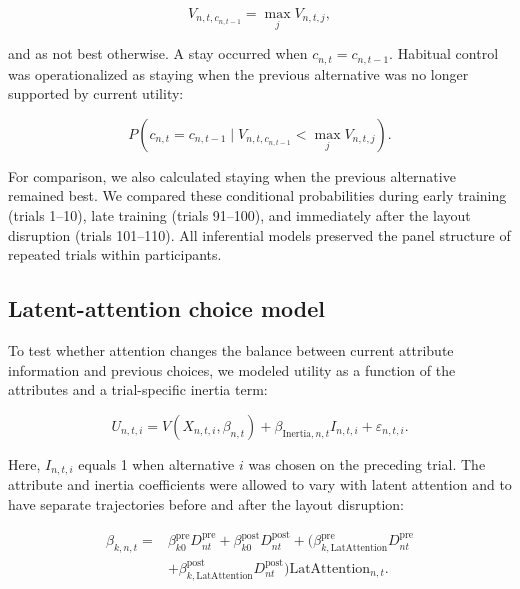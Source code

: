 \documentclass[man,natbib,floatsintext]{apa7}
\begin{document}
\begin{equation}
V_{n,t,c_{n,t-1}}=\max_j V_{n,t,j},
\end{equation}

and as not best otherwise. A stay occurred when $c_{n,t}=c_{n,t-1}$. Habitual control was operationalized as staying when the previous alternative was no longer supported by current utility:

\begin{equation}
P(c_{n,t}=c_{n,t-1}\mid
V_{n,t,c_{n,t-1}}<\max_j V_{n,t,j}).
\end{equation}

For comparison, we also calculated staying when the previous alternative remained best. We compared these conditional probabilities during early training (trials 1--10), late training (trials 91--100), and immediately after the layout disruption (trials 101--110). All inferential models preserved the panel structure of repeated trials within participants.

\subsection{Latent-attention choice model}

To test whether attention changes the balance between current attribute information and previous choices, we modeled utility as a function of the attributes and a trial-specific inertia term:

\begin{equation}
U_{n,t,i} =
V(X_{n,t,i}, \beta_{n,t})
+ \beta_{\text{Inertia},n,t} I_{n,t,i}
+ \varepsilon_{n,t,i}.
\end{equation}

Here, $I_{n,t,i}$ equals 1 when alternative $i$ was chosen on the preceding trial. The attribute and inertia coefficients were allowed to vary with latent attention and to have separate trajectories before and after the layout disruption:

\begin{equation}
\begin{split}
    \beta_{k,n,t} =&\beta_{k0}^{\mathrm{pre}}D^{\mathrm{pre}}_{nt} +\beta_{k0}^{\mathrm{post}}D^{\mathrm{post}}_{nt} + \biggl( \beta_{k,\text{LatAttention}}^{\mathrm{pre}}D^{\mathrm{pre}}_{nt} \\
&+\beta_{k,\text{LatAttention}}^{\mathrm{post}}D^{\mathrm{post}}_{nt} \biggr)\text{LatAttention}_{n,t}.
\end{split}
\end{equation}
\end{document}
